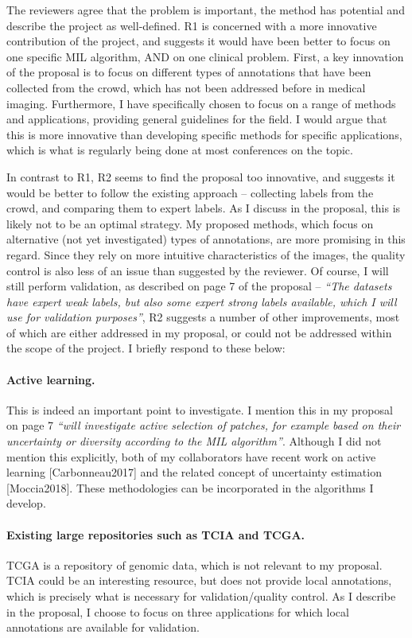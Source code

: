 \documentclass[serif, twocolumn, numeric, rga]{jote-article}
\begin{document}
The reviewers agree that the problem is important, the method has potential and describe the project as well-defined. R1 is concerned with a more innovative contribution of the project, and suggests it would have been better to focus on one specific MIL algorithm, AND on one clinical problem. First, a key innovation of the proposal is to focus on different types of annotations that have been collected from the crowd, which has not been addressed before in medical imaging. Furthermore, I have specifically chosen to focus on a range of methods and applications, providing general guidelines for the field. I would argue that this is more innovative than developing specific methods for specific applications, which is what is regularly being done at most conferences on the topic.

In contrast to R1, R2 seems to find the proposal too innovative, and suggests it would be better to follow the existing approach – collecting labels from the crowd, and comparing them to expert labels. As I discuss in the proposal, this is likely not to be an optimal strategy. My proposed methods, which focus on alternative (not yet investigated) types of annotations, are more promising in this regard. Since they rely on more intuitive characteristics of the images, the quality control is also less of an issue than suggested by the reviewer. Of course, I will still perform validation, as described on page 7 of the proposal – \textit{\textcolor{jotedark}{``The datasets have expert weak labels, but also some expert strong labels available, which I will use for validation purposes''}}, R2 suggests a number of other improvements, most of which are either addressed in my proposal, or could not be addressed within the scope of the project. I briefly respond to these below:

\paragraph{Active learning.} This is indeed an important point to investigate. I mention this in my proposal on page 7 \textit{\textcolor{jotedark}{``will investigate active selection of patches, for example based on their uncertainty or diversity according to the MIL algorithm''}}. Although I did not mention this explicitly, both of my collaborators have recent work on active learning [Carbonneau2017] and the related concept of uncertainty estimation [Moccia2018]. These methodologies can be incorporated in the algorithms I develop.

\paragraph{Existing large repositories such as TCIA and TCGA.} TCGA is a repository of genomic data, which is not relevant to my proposal. TCIA could be an interesting resource, but does not provide local annotations, which is precisely what is necessary for validation/quality control. As I describe in the proposal, I choose to focus on three applications for which local annotations are available for validation.
\end{document}
